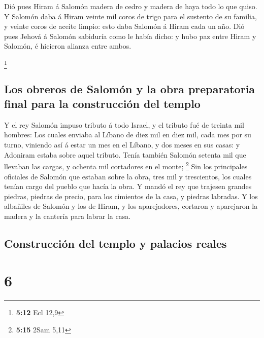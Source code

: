  Dió pues Hiram á Salomón madera de cedro y madera de
haya todo lo que quiso.  Y Salomón daba á Hiram veinte
mil coros de trigo para el sustento de su familia, y veinte coros de
aceite limpio: esto daba Salomón á Hiram cada un año. 
Dió pues Jehová á Salomón sabiduría como le había dicho: y hubo paz
entre Hiram y Salomón, é hicieron alianza entre ambos.

\footnote{\textbf{5:12} Ecl 12,9}

\hypertarget{los-obreros-de-salomuxf3n-y-la-obra-preparatoria-final-para-la-construcciuxf3n-del-templo}{%
\subsection{Los obreros de Salomón y la obra preparatoria final para la
construcción del
templo}\label{los-obreros-de-salomuxf3n-y-la-obra-preparatoria-final-para-la-construcciuxf3n-del-templo}}

 Y el rey Salomón impuso tributo á todo Israel, y el
tributo fué de treinta mil hombres:  Los cuales enviaba
al Líbano de diez mil en diez mil, cada mes por su turno, viniendo así á
estar un mes en el Líbano, y dos meses en sus casas: y Adoniram estaba
sobre aquel tributo.  Tenía también Salomón setenta mil
que llevaban las cargas, y ochenta mil cortadores en el monte;
\footnote{\textbf{5:15} 2Sam 5,11}  Sin los principales
oficiales de Salomón que estaban sobre la obra, tres mil y trescientos,
los cuales tenían cargo del pueblo que hacía la obra.  Y
mandó el rey que trajesen grandes piedras, piedras de precio, para los
cimientos de la casa, y piedras labradas.  Y los
albañiles de Salomón y los de Hiram, y los aparejadores, cortaron y
aparejaron la madera y la cantería para labrar la casa.

\hypertarget{construcciuxf3n-del-templo-y-palacios-reales}{%
\subsection{Construcción del templo y palacios
reales}\label{construcciuxf3n-del-templo-y-palacios-reales}}

\hypertarget{section-5}{%
\section{6}\label{section-5}}

